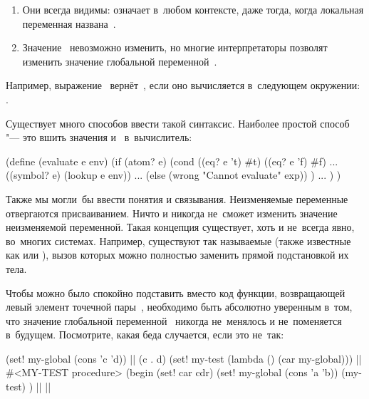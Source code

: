 \begin{enumerate}
  \item Они всегда видимы:  означает  в~любом
        контексте, даже тогда, когда локальная переменная
        названа~.

  \item Значение~ невозможно изменить, но многие интерпретаторы
        позволят изменить значение глобальной переменной~.
\end{enumerate}

Например, выражение~ вернёт~, если оно вычисляется
в~следующем окружении: .

Существует много способов ввести такой синтаксис. Наиболее простой способ "---
это вшить значения  и~ в~вычислитель:

\begin{code:lisp}
(define (evaluate e env)
  (if (atom? e)
      (cond ((eq? e 't) #t)
            ((eq? e 'f) #f)
            ...
            ((symbol? e) (lookup e env))
            ...
            (else (wrong "Cannot evaluate" exp)) )
      ... ) )
\end{code:lisp}

Также мы могли~бы ввести понятия  и 
связывания. Неизменяемые переменные отвергаются присваиванием. Ничто и никогда
не~сможет изменить значение неизменяемой переменной. Такая концепция существует,
хоть и не~всегда явно, во~многих системах. Например, существуют так называемые
 (также известные как  или
), вызов которых можно полностью заменить прямой подстановкой
их тела. 

Чтобы можно было спокойно подставить вместо  код функции,
возвращающей левый элемент точечной пары~, необходимо быть абсолютно
уверенным в~том, что значение глобальной переменной~ никогда не~менялось
и не~поменяется в~будущем. Посмотрите, какая беда случается, если это не~так:

\begin{code:lisp}
(set! my-global (cons 'c 'd))
   |\is| (c . d)
(set! my-test (lambda () (car my-global)))
   |\is| #<MY-TEST procedure>
(begin (set! car cdr)
       (set! my-global (cons 'a 'b))
       (my-test) )
   |\is| ||
\end{code:lisp}


